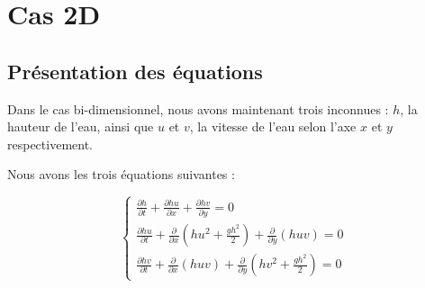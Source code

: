 \documentclass[
11pt, %
francais, %
singlespacing, %
headsepline, %
]{MastersDoctoralThesis} %
\theoremstyle{definition}
\begin{document}
\begin{comment}
\begin{figure}[h]
\begin{center}$
\begin{array}{ccc}
\texttt{[image: "deltaT=.5 tau t=0 N=64"]} &
\texttt{[image: "deltaT=.5 tau t=0 N=64"]} &
\texttt{[image: "deltaT=.5 tau t=0 N=64"]}
\\
\texttt{[image: "deltaT=.5 tau t=10 N=64"]} &
\texttt{[image: "deltaT=tau t=10 N=64"]} &
\texttt{[image: "deltaT=2tau t=10 N=64"]}
\\
\texttt{[image: "deltaT=.5 tau t=20 N=64"]} &
\texttt{[image: "deltaT=tau t=20 N=64"]} &
\texttt{[image: "deltaT=2tau t=20 N=64"]}
\\
\texttt{[image: "deltaT=.5 tau t=30 N=64"]} &
\texttt{[image: "deltaT=tau t=30 N=64"]} &
\texttt{[image: "deltaT=2tau t=30 N=64"]}
\end{array}$
\end{center}
\caption{Simulations pour différentes valeurs de $\tau$}
\end{figure}

De même, plus le pas temporel est faible, plus la quantité d'eau est conservée au cours du temps. On remarque aussi que la quantité d'eau est bien conservée quand la vague est au centre du repère. Cependant, quand elle atteint le bord et disparaît aux limites, la quantité d'eau baisse brutalement ( il suffit de comparer la quantité entre $t=0\ s$ et $t=20\ s$ puis la quantité entre $t=20\ s$ et $t=30\ s$ ). 
\end{comment}

\newpage
\section{Cas 2D}

\subsection{Présentation des équations}

Dans le cas bi-dimensionnel, nous avons maintenant trois inconnues : $h$, la hauteur de l'eau, ainsi que $u$ et $v$, la vitesse de l'eau selon l'axe $x$ et $y$ respectivement.

Nous avons les trois équations suivantes : 

$$\left\{
    \begin{array}{lll}
        \frac{\partial h}{\partial t} + \frac{\partial hu}{\partial x} + \frac{\partial hv}{\partial y} = 0 \\
        \frac{\partial hu}{\partial t} + \frac{\partial}{\partial x} ( hu^2 + \frac{gh^2}{2} ) + \frac{\partial}{\partial y} ( huv  ) = 0 \\
        \frac{\partial hv}{\partial t} + \frac{\partial}{\partial x} ( huv ) + \frac{\partial}{\partial y} ( hv^2 + \frac{gh^2}{2} ) = 0
    \end{array}
\right.
$$
\end{document}

